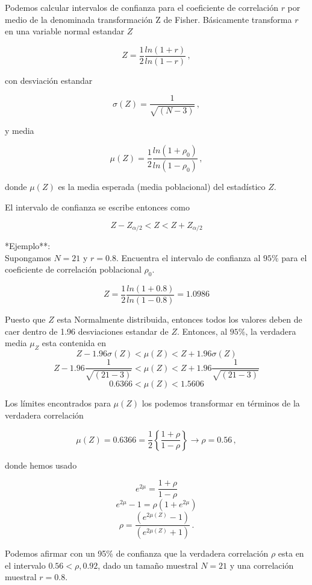 \documentclass[
]{agujournal2019}
\begin{document}
Podemos calcular intervalos de confianza para el coeficiente de
correlación \(r\) por medio de la denominada transformación Z de Fisher.
Básicamente transforma \(r\) en una variable normal estandar \(Z\)

\[Z=\frac{1}{2}\frac{ln(1+r)}{ln(1-r)}\,,\]

con desviación estandar

\[\sigma(Z)=\frac{1}{\sqrt{(N-3)}}\,,\]

y media

\[\mu(Z)=\frac{1}{2}\frac{ln(1+\rho_0)}{ln(1-\rho_0)}\,,\]

donde \(\mu(Z)\) es la media esperada (media poblacional) del
estadístico \(Z\).

El intervalo de confianza se escribe entonces como

\[Z-Z_{\alpha/2}<Z<Z+Z_{\alpha/2}\]

\vspace{0.5cm}

\noindent **Ejemplo**:\\

Supongamos \(N=21\) y \(r=0.8\). Encuentra el intervalo de confianza al
\(95\%\) para el coeficiente de correlación poblacional \(\rho_0\).

\[Z=\frac{1}{2}\frac{ln(1+0.8)}{ln(1-0.8)}=1.0986\]

Puesto que \(Z\) esta Normalmente distribuida, entonces todos los
valores deben de caer dentro de 1.96 desviaciones estandar de \(Z\).
Entonces, al \(95\%\), la verdadera media \(\mu_Z\) esta contenida en
\[Z-1.96\sigma(Z) < \mu(Z) < Z + 1.96\sigma(Z)\]
\[Z-1.96\frac{1}{\sqrt{(21-3)}} < \mu(Z) < Z + 1.96\frac{1}{\sqrt{(21-3)}}\]
\[0.6366<\mu(Z)<1.5606\]

Los límites encontrados para \(\mu(Z)\) los podemos transformar en
términos de la verdadera correlación

\[\mu(Z)=0.6366=\frac{1}{2} \left\{ \frac{1+\rho}{1-\rho} \right\} \rightarrow  \rho=0.56\,,\]

donde hemos usado

\[e^{2\mu}=\frac{1+\rho}{1-\rho}\] \[e^{2\mu}-1=\rho(1+e^{2\mu})\]
\[\rho=\frac{(e^{2\mu(Z)}-1)}{(e^{2\mu(Z)}+1)}\,.\]

Podemos afirmar con un 95\% de confianza que la verdadera correlación
\(\rho\) esta en el intervalo \(0.56<\rho,0.92\), dado un tamaño
muestral \(N=21\) y una correlación muestral \(r=0.8\).

\vspace{0.5cm}
\end{document}
